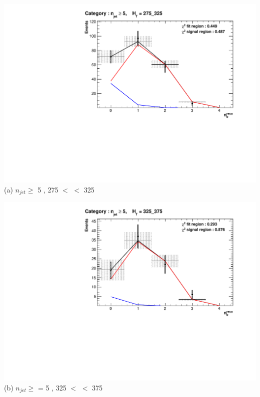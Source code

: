 \begin{minipage}{\textwidth}
\footnotesize
\centering
\begin{minipage}[b]{0.50\linewidth}
\includegraphics[width = 1.0\linewidth]{plots/ThesisPlots/Final_Fit_To_Data_Normal_Medium_HTBin_OneMuon_275_325_jet_mult_5.pdf}
\centering (a) $n_{jet} \geq$  5 , 275 $<$ \theht $<$ 325
\end{minipage}
\begin{minipage}[b]{0.50\linewidth}
\includegraphics[width = 1.0\linewidth]{plots/ThesisPlots/Final_Fit_To_Data_Normal_Medium_HTBin_OneMuon_325_375_jet_mult_5.pdf}
\centering (b) $n_{jet} \geq$ = 5 , 325 $<$ \theht $<$ 375 
\end{minipage}
\end{minipage}
